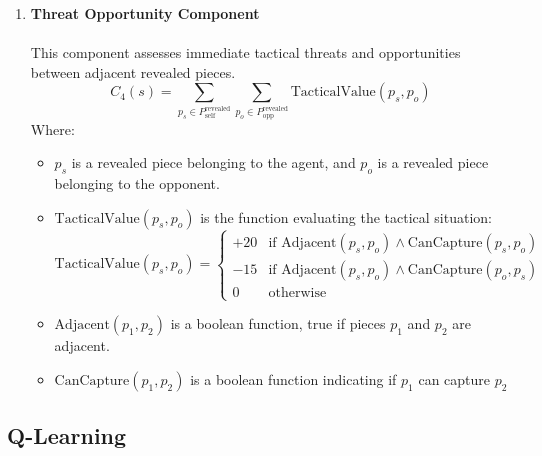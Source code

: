\documentclass{article}
\begin{document}
\begin{enumerate}
    \item  \textbf{Threat Opportunity Component}
            \\
            \\
            This component  assesses immediate tactical threats and opportunities between adjacent revealed pieces.
            \begin{equation}
            \label{eq:minimax_c4}
            C_4(s) = \sum_{p_s \in P_{\text{self}}^{\text{revealed}}} \sum_{p_o \in P_{\text{opp}}^{\text{revealed}}} \text{TacticalValue}(p_s, p_o)
            \end{equation}
            Where:
            \begin{itemize}
                \item $p_s$ is a revealed piece belonging to the agent, and $p_o$ is a revealed piece belonging to the opponent.
                \item $\text{TacticalValue}(p_s, p_o)$ is the function evaluating the tactical situation:
                \begin{equation}
                \label{eq:minimax_tactical_value}
                \text{TacticalValue}(p_s, p_o) = \begin{cases}
                +20 & \text{if } \text{Adjacent}(p_s, p_o) \land \text{CanCapture}(p_s, p_o) \\
                -15 & \text{if } \text{Adjacent}(p_s, p_o) \land \text{CanCapture}(p_o, p_s) \\
                0 & \text{otherwise}
                \end{cases}
                \end{equation}
                \item $\text{Adjacent}(p_1, p_2)$ is a boolean function, true if pieces $p_1$ and $p_2$ are adjacent.
                \item $\text{CanCapture}(p_1, p_2)$ is a boolean function indicating if $p_1$ can capture $p_2$ 
            \end{itemize}
            
            
            
\end{enumerate}





\subsection{Q-Learning}
\end{document}
